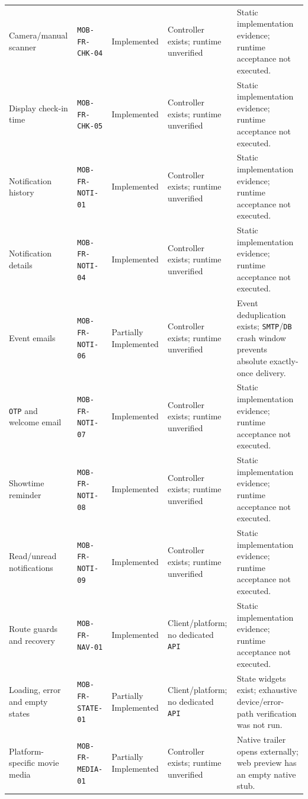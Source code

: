 \begin{longtable}{@{}P{0.19000\SRSWidth}P{0.18000\SRSWidth}P{0.15000\SRSWidth}P{0.20000\SRSWidth}P{0.28000\SRSWidth}@{}}
Camera/\allowbreak{}manual scanner & \texttt{MOB-\allowbreak{}FR-\allowbreak{}CHK-\allowbreak{}04} & Implemented & Controller exists; runtime unverified & Static implementation evidence; runtime acceptance not executed. \\[3pt]
Display check-in time & \texttt{MOB-\allowbreak{}FR-\allowbreak{}CHK-\allowbreak{}05} & Implemented & Controller exists; runtime unverified & Static implementation evidence; runtime acceptance not executed. \\[3pt]
Notification history & \texttt{MOB-\allowbreak{}FR-\allowbreak{}NOTI-\allowbreak{}01} & Implemented & Controller exists; runtime unverified & Static implementation evidence; runtime acceptance not executed. \\[3pt]
Notification details & \texttt{MOB-\allowbreak{}FR-\allowbreak{}NOTI-\allowbreak{}04} & Implemented & Controller exists; runtime unverified & Static implementation evidence; runtime acceptance not executed. \\[3pt]
Event emails & \texttt{MOB-\allowbreak{}FR-\allowbreak{}NOTI-\allowbreak{}06} & Partially Implemented & Controller exists; runtime unverified & Event deduplication exists; \texttt{SMTP}/\allowbreak{}\texttt{DB} crash window prevents absolute exactly-once delivery. \\[3pt]
\texttt{OTP} and welcome email & \texttt{MOB-\allowbreak{}FR-\allowbreak{}NOTI-\allowbreak{}07} & Implemented & Controller exists; runtime unverified & Static implementation evidence; runtime acceptance not executed. \\[3pt]
Showtime reminder & \texttt{MOB-\allowbreak{}FR-\allowbreak{}NOTI-\allowbreak{}08} & Implemented & Controller exists; runtime unverified & Static implementation evidence; runtime acceptance not executed. \\[3pt]
Read/\allowbreak{}unread notifications & \texttt{MOB-\allowbreak{}FR-\allowbreak{}NOTI-\allowbreak{}09} & Implemented & Controller exists; runtime unverified & Static implementation evidence; runtime acceptance not executed. \\[3pt]
Route guards and recovery & \texttt{MOB-\allowbreak{}FR-\allowbreak{}NAV-\allowbreak{}01} & Implemented & Client/\allowbreak{}platform; no dedicated \texttt{API} & Static implementation evidence; runtime acceptance not executed. \\[3pt]
Loading, error and empty states & \texttt{MOB-\allowbreak{}FR-\allowbreak{}STATE-\allowbreak{}01} & Partially Implemented & Client/\allowbreak{}platform; no dedicated \texttt{API} & State widgets exist; exhaustive device/\allowbreak{}error-path verification was not run. \\[3pt]
Platform-specific movie media & \texttt{MOB-\allowbreak{}FR-\allowbreak{}MEDIA-\allowbreak{}01} & Partially Implemented & Controller exists; runtime unverified & Native trailer opens externally; web preview has an empty native stub. \\[3pt]
\end{longtable}
\endgroup

